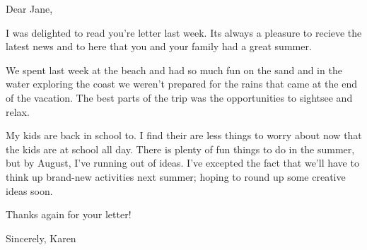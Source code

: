Dear Jane,

I was delighted to read you're letter last week. Its always a pleasure to recieve the latest news and to here that you and your family had a great summer.

We spent last week at the beach and had so much fun on the sand and in the water exploring the coast we weren't prepared for the rains that came at the end of the vacation. The best parts of the trip was the opportunities to sightsee and relax.

My kids are back in school to. I find their are less things to worry about now that the kids are at school all day. There is plenty of fun things to do in the summer, but by August, I've running out of ideas. I've excepted the fact that we'll have to think up brand-new activities next summer; hoping to round up some creative ideas soon.

Thanks again for your letter!

Sincerely,
Karen
